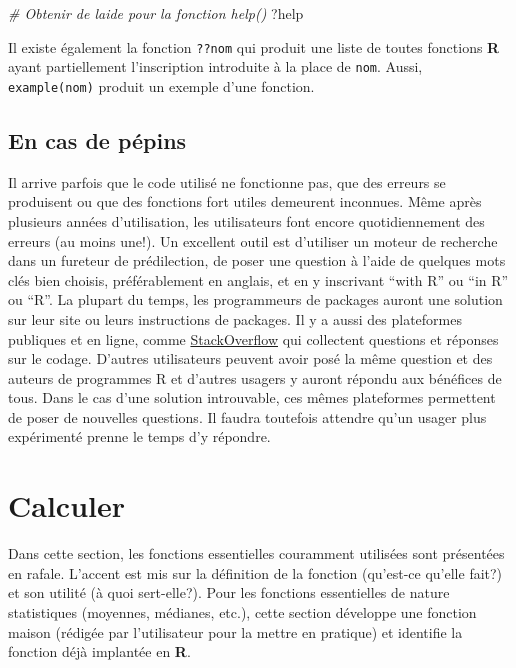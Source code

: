 \documentclass[
]{book}
\newenvironment{Shaded}{}{}
\newcommand{\CommentTok}[1]{\textit{#1}}
\newcommand{\NormalTok}[1]{#1}
\begin{document}
\begin{Shaded}
\begin{Highlighting}[]
\CommentTok{\# Obtenir de l\textquotesingle{}aide pour la fonction help()}
\NormalTok{?help}
\end{Highlighting}
\end{Shaded}

Il existe également la fonction \texttt{??nom} qui produit une liste de toutes fonctions \textbf{R} ayant partiellement l'inscription introduite à la place de \texttt{nom}. Aussi, \texttt{example(nom)} produit un exemple d'une fonction.

\hypertarget{en-cas-de-puxe9pins}{%
\section{En cas de pépins}\label{en-cas-de-puxe9pins}}

Il arrive parfois que le code utilisé ne fonctionne pas, que des erreurs se produisent ou que des fonctions fort utiles demeurent inconnues. Même après plusieurs années d'utilisation, les utilisateurs font encore quotidiennement des erreurs (au moins une!). Un excellent outil est d'utiliser un moteur de recherche dans un fureteur de prédilection, de poser une question à l'aide de quelques mots clés bien choisis, préférablement en anglais, et en y inscrivant ``with R'' ou ``in R'' ou ``R''. La plupart du temps, les programmeurs de packages auront une solution sur leur site ou leurs instructions de packages. Il y a aussi des plateformes publiques et en ligne, comme \href{https://stackoverflow.com/}{StackOverflow} qui collectent questions et réponses sur le codage. D'autres utilisateurs peuvent avoir posé la même question et des auteurs de programmes R et d'autres usagers y auront répondu aux bénéfices de tous. Dans le cas d'une solution introuvable, ces mêmes plateformes permettent de poser de nouvelles questions. Il faudra toutefois attendre qu'un usager plus expérimenté prenne le temps d'y répondre.

\hypertarget{calculer}{%
\chapter{Calculer}\label{calculer}}

Dans cette section, les fonctions essentielles couramment utilisées sont présentées en rafale. L'accent est mis sur la définition de la fonction (qu'est-ce qu'elle fait?) et son utilité (à quoi sert-elle?). Pour les fonctions essentielles de nature statistiques (moyennes, médianes, etc.), cette section développe une fonction maison (rédigée par l'utilisateur pour la mettre en pratique) et identifie la fonction déjà implantée en \textbf{R}.
\end{document}
